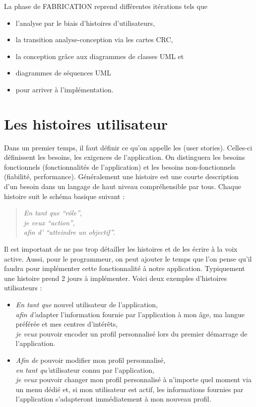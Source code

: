 La phase de FABRICATION reprend différentes itérations tels que
\begin{itemize}
  \item l'analyse par le biais d'histoires d'utilisateurs,
  \item la transition analyse-conception via les cartes CRC,
  \item la conception grâce aux diagrammes de classes UML et
  \item diagrammes de séquences UML
  \item pour arriver à l'implémentation.
\end{itemize}

\section{Les histoires utilisateur}
Dans un premier temps,
il faut définir ce qu'on appelle les
 (user stories).
Celles-ci définissent les besoins,
les exigences de l'application.
On distinguera les besoins fonctionnels (fonctionnalités de l'application) et
les besoins non-fonctionnels (fiabilité, performance).
Généralement une histoire est une courte description d'un besoin
dans un langage de haut niveau compréhensible par tous.
Chaque histoire suit le schéma basique suivant :
\begin{quote}
  \emph{En tant que ``rôle'',
  \\je veux ``action'',
  \\afin d' ``atteindre un objectif''.}
\end{quote}
Il est important de ne pas trop détailler les histoires
et de les écrire à la voix active.
Aussi, pour le programmeur,
on peut ajouter le temps que l'on pense qu'il faudra pour
implémenter cette fonctionnalité à notre application.
Typiquement une histoire prend 2 jours à implémenter.
Voici deux exemples d'histoires utilisateurs :
\begin{itemize}
  \item \emph{En tant que} nouvel utilisateur de l'application,\\
    \emph{afin d'}adapter l'information fournie par l'application à mon âge,
    ma langue préférée et mes centres d'intérêts,\\
    \emph{je veux} pouvoir encoder un profil
    personnalisé lors du premier démarrage de l'application.
  \item	\emph{Afin de} pouvoir modifier mon profil personnalisé,\\
    \emph{en tant qu'}utilisateur connu par l'application,\\
    \emph{je veux} pouvoir changer mon profil personnalisé à n'importe
    quel moment via un menu dédié et,
    si mon utilisateur est actif,
    les informations fournies par l'application s'adapteront immédiatement
    à mon nouveau profil.
\end{itemize}

